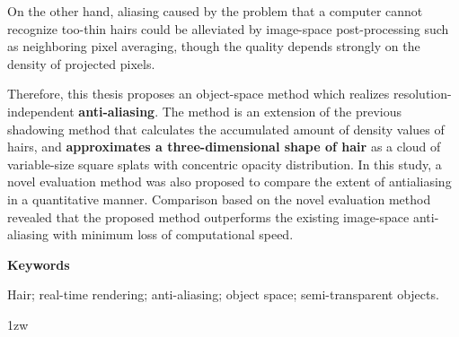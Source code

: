On the other hand, aliasing caused by the problem that a computer cannot recognize too-thin hairs could be alleviated by image-space post-processing such as neighboring pixel averaging, though the quality depends strongly on the density of projected pixels.\par
%
Therefore, this thesis proposes an object-space method which realizes resolution-independent \textbf{anti-aliasing}. The method is an extension of the previous shadowing method that calculates the accumulated amount of density values of hairs, and \textbf{approximates a three-dimensional shape of hair} as a cloud of variable-size square splats with concentric opacity distribution.
%
In this study, a novel evaluation method was also proposed to compare the extent of antialiasing in a quantitative manner.
%
Comparison based on the novel evaluation method revealed that the proposed method outperforms the existing image-space anti-aliasing with minimum loss of computational speed.
%
% 
\vspace{4ex}

\noindent
{\bf Keywords}

\noindent
Hair; real-time rendering; anti-aliasing; object space; semi-transparent objects.
 
\parindent 1zw